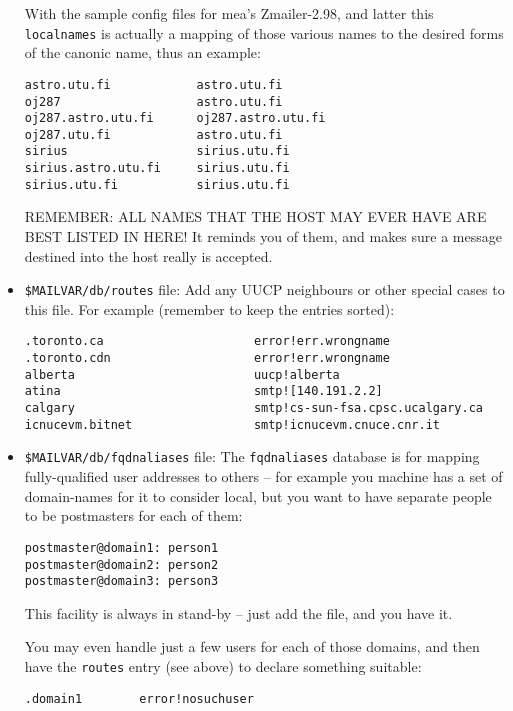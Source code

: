 \begin{itemize}
With the sample config files for mea's Zmailer-2.98, and latter
this {\tt localnames} is actually a mapping of those various names to
the desired forms of the canonic name, thus an example:
\begin{tscreen}
\begin{verbatim}
astro.utu.fi            astro.utu.fi
oj287                   astro.utu.fi
oj287.astro.utu.fi      oj287.astro.utu.fi
oj287.utu.fi            astro.utu.fi
sirius                  sirius.utu.fi
sirius.astro.utu.fi     sirius.utu.fi
sirius.utu.fi           sirius.utu.fi
\end{verbatim}
\end{tscreen}

REMEMBER: ALL NAMES THAT THE HOST MAY EVER HAVE ARE BEST LISTED
IN HERE!  It reminds you of them, and makes sure a message
destined into the host really is accepted.
\item {\tt \$MAILVAR/db/routes} file: Add any UUCP neighbours or other special cases to this file.  For
example (remember to keep the entries sorted):
\begin{tscreen}
\begin{verbatim}
.toronto.ca                     error!err.wrongname
.toronto.cdn                    error!err.wrongname
alberta                         uucp!alberta
atina                           smtp![140.191.2.2]
calgary                         smtp!cs-sun-fsa.cpsc.ucalgary.ca
icnucevm.bitnet                 smtp!icnucevm.cnuce.cnr.it
\end{verbatim}
\end{tscreen}
\item {\tt \$MAILVAR/db/fqdnaliases} file: The {\tt fqdnaliases} database is for mapping fully-qualified user
addresses to others -- for example you machine has a set of
domain-names for it to consider local, but you want to have
separate people to be postmasters for each of them:
\begin{tscreen}
\begin{verbatim}
postmaster@domain1: person1
postmaster@domain2: person2
postmaster@domain3: person3
\end{verbatim}
\end{tscreen}

This facility is always in stand-by -- just add the file, and
you have it.

You may even handle just a few users for each of those domains, and
then have the {\tt routes} entry (see above) to declare something suitable:
\begin{tscreen}
\begin{verbatim}
.domain1        error!nosuchuser
\end{verbatim}
\end{tscreen}


\end{itemize}
